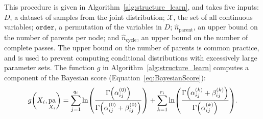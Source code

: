 \documentclass[twoside,11pt]{article}
\newcommand{\paren}[1]{\mathopen{}\mathclose\bgroup\left(#1\aftergroup\egroup\right)}
\DeclareMathOperator{\Pa}{pa} %
\newcommand{\cX}{\mathcal{X}} %
\newcommand{\maxpasses}{\hat{n}_\text{cycle}}
\begin{document}
This procedure is given in Algorithm~\ref{alg:structure_learn}, and takes five inputs: $D$, a dataset of samples from the joint distribution; $\bm{\cX}$, the set of all continuous variables; $\texttt{order}$, a permutation of the variables in $D$; $\hat{n}_\text{parent}$, an upper bound on the number of parents per node; and $\maxpasses$, an upper bound on the number of complete passes.
The upper bound on the number of parents is common practice, and is used to prevent computing conditional distributions with excessively large parameter sets.
The function $g$ in Algorithm~\ref{alg:structure_learn} computes a component of the Bayesian score (Equation~\ref{eq:BayesianScore}):
\begin{equation}
  \label{eq:B_Score_one}
  g\paren{X_i, \Pa_{X_i}} =  \sum_{j=1}^{q_i} \ln\paren{
    \frac{
      \mathrm{\Gamma}\paren{\alpha_{ij}^{(0)}}
    }{
      \mathrm{\Gamma}\paren{\alpha_{ij}^{(0)} + \beta_{ij}^{(0)}}
    }
  } + \sum_{k=1}^{r_i} \ln \paren{
    \frac{
      \mathrm{\Gamma}\paren{\alpha_{ij}^{(k)} + \beta_{ij}^{(k)}}
    }{
      \mathrm{\Gamma}\paren{\alpha_{ij}^{(k)}}
    }
  }\text{.}
\end{equation}
\end{document}
